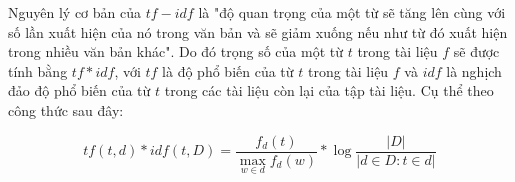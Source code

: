 Nguyên lý cơ bản của $tf-idf$ là "độ quan trọng của một từ sẽ tăng lên cùng với số lần xuất hiện của nó trong văn bản và sẽ giảm xuống nếu như từ đó xuất hiện trong nhiều văn bản khác". Do đó trọng số của một từ $t$ trong tài liệu $f$ sẽ được tính bằng $tf * idf$, với $tf$ là độ phổ biến của từ $t$ trong tài liệu $f$ và $idf$ là nghịch đảo độ phổ biến của từ $t$ trong các tài liệu còn lại của tập tài liệu. Cụ thể theo công thức sau đây:

\begin{equation}
tf(t, d) * idf(t, D) = \dfrac{f_d(t)}{\max_{w \in d} f_d(w)} * \log{\dfrac{|D|}{|d \in D : t \in d|}}
\end{equation}
